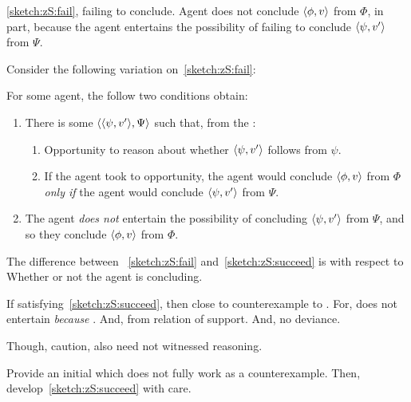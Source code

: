 \begin{note}
  \autoref{sketch:zS:fail}, failing to conclude.
  Agent does not conclude \(\langle \phi, v \rangle\) from \(\Phi\), in part, because the agent entertains the possibility of failing to conclude \(\langle \psi, v' \rangle\) from \(\Psi\).

  Consider the following variation on~\autoref{sketch:zS:fail}:
  \begin{sketch}
    \label{sketch:zS:succeed}
    For some agent, the follow two conditions obtain:
    \begin{enumerate}
    \item
      \label{sketch:zS:succeed:curb}
      There is some \(\langle \langle \psi, v' \rangle, \Psi \rangle\) such that, from the \agpe{}:
      \begin{enumerate}[label=\alph*., ref=(\alph*)]
      \item
        \label{sketch:zS:succeed:curb:opportunity}
        Opportunity to reason about whether \(\langle \psi, v' \rangle\) follows from \(\psi\).
      \item
        \label{sketch:zS:succeed:curb:conditional}
        If the agent took to opportunity, the agent would conclude \(\langle \phi, v \rangle\) from \(\Phi\) \emph{only if} the agent would conclude \(\langle \psi, v' \rangle\) from \(\Psi\).
      \end{enumerate}
    \item
      \label{sketch:zS:succeed:no-c}
      The agent \emph{does not} entertain the possibility of concluding \(\langle \psi, v' \rangle\) from \(\Psi\), and so they conclude \(\langle \phi, v \rangle\) from \(\Phi\).
    \end{enumerate}%
    \vspace{-\baselineskip}
  \end{sketch}

  The difference between ~\ref{sketch:zS:fail} and~\ref{sketch:zS:succeed} is with respect to {\color{red} Whether or not the agent is concluding}.
\end{note}

\begin{note}
  If  satisfying~\autoref{sketch:zS:succeed}, then close to counterexample to \issueConstraint{}.
  For, does not entertain \emph{because} \fc{}.
  And, from  \fc{} relation of support.
  And, no deviance.

  Though, caution, also need not witnessed reasoning.

  Provide an initial \scen{} which does not fully work as a counterexample.
  Then, develop~\autoref{sketch:zS:succeed} with care.
\end{note}

